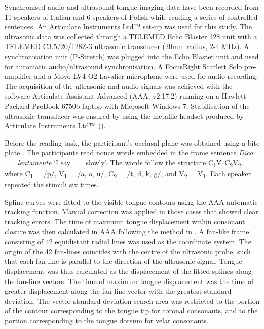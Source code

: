 \documentclass[12pt,]{article}
\begin{document}
Synchronised audio and ultrasound tongue imaging data have been recorded
from 11 speakers of Italian and 6 speakers of Polish while reading a
series of controlled sentences. An Articulate Instruments Ltd™ set-up
was used for this study. The ultrasonic data was collected through a
TELEMED Echo Blaster 128 unit with a TELEMED C3.5/20/128Z-3 ultrasonic
transducer (20mm radius, 2-4 MHz). A synchronisation unit (P-Stretch)
was plugged into the Echo Blaster unit and used for automatic
audio/ultrasound synchronisation. A FocusRight Scarlett Solo
pre-amplifier and a Movo LV4-O2 Lavalier microphone were used for audio
recording. The acquisition of the ultrasonic and audio signals was
achieved with the software Articulate Assistant Advanced (AAA, v2.17.2)
running on a Hawlett-Packard ProBook 6750b laptop with Microsoft Windows
7. Stabilisation of the ultrasonic transducer was ensured by using the
metallic headset produced by Articulate Instruments Ltd™
(\citeyear{articulate2008}).

Before the reading task, the participant's occlusal plane was obtained
using a bite plate \citep{scobbie2011}. The participants read nonce
words embedded in the frame sentence \emph{Dico \_\_ lentamente} `I say
\_\_ slowly'. The words follow the structure
C\textsubscript{1}V́\textsubscript{1}C\textsubscript{2}V\textsubscript{2},
where C\textsubscript{1} = /p/, V\textsubscript{1} = /a, o, u/,
C\textsubscript{2} = /t, d, k, g/, and V\textsubscript{2} =
V\textsubscript{1}. Each speaker repeated the stimuli six times.

Spline curves were fitted to the visible tongue contours using the AAA
automatic tracking function. Manual correction was applied in those
cases that showed clear tracking errors. The time of maximum tongue
displacement within consonant closure was then calculated in AAA
following the method in \citet{strycharczuk2015}. A fan-like frame
consisting of 42 equidistant radial lines was used as the coordinate
system. The origin of the 42 fan-lines coincides with the centre of the
ultrasonic probe, such that each fan-line is parallel to the direction
of the ultrasonic signal. Tongue displacement was thus calculated as the
displacement of the fitted splines along the fan-line vectors. The time
of maximum tongue displacement was the time of greater displacement
along the fan-line vector with the greatest standard deviation. The
vector standard deviation search area was restricted to the portion of
the contour corresponding to the tongue tip for coronal consonants, and
to the portion corresponding to the tongue dorsum for velar consonants.
\end{document}
